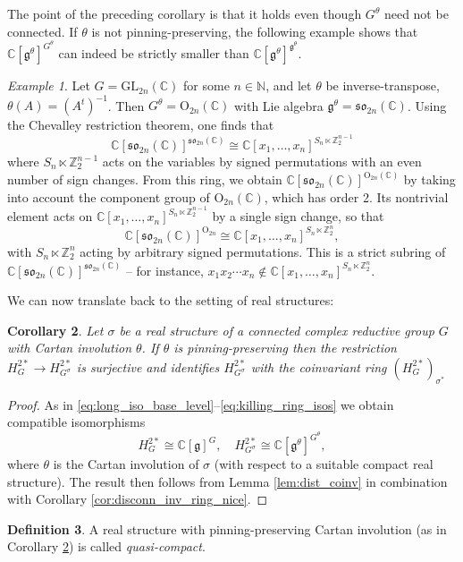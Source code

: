 \documentclass{amsart}
\newcommand{\C}{\mathbb{C}}
\newcommand{\g}{\mathfrak{g}}
\newcommand{\GL}{\mathrm{GL}}
\newcommand{\N}{\mathbb{N}}
\renewcommand{\O}{\mathrm{O}}
\newcommand{\so}{\mathfrak{so}}
\newcommand{\Z}{\mathbb{Z}}
\newcommand{\inv}{^{-1}}
\theoremstyle{definition}
\newtheorem{defn}{Definition}[section]
\theoremstyle{plain}
\newtheorem{cor}[defn]{Corollary}
\theoremstyle{remark}
\newtheorem{expl}[defn]{Example}
\begin{document}
The point of the preceding corollary is that it holds even though $G^\theta$ need not be connected. If $\theta$ is not pinning-preserving, the following example shows that $\C[\g^\theta]^{G^\theta}$ can indeed be strictly smaller than $\C[\g^\theta]^{\g^\theta}$.
\begin{expl}
\label{expl:typeAexpl}
    Let $G = \GL_{2n}(\C)$ for some $n\in \N$, and let $\theta$ be inverse-transpose, $\theta(A) = (A^t)\inv$. Then $G^\theta = \O_{2n}(\C)$ with Lie algebra $\g^\theta = \so_{2n}(\C)$. Using the Chevalley restriction theorem, one finds that
    $$
        \C[\so_{2n}(\C)]^{\so_{2n}(\C)}
        \cong
        \C[x_1,\ldots, x_n]^{S_n\ltimes \Z_2^{n-1}}
    $$
    where $S_n\ltimes \Z_2^{n-1}$ acts on the variables by signed permutations with an even number of sign changes. From this ring, we obtain $\C[\so_{2n}(\C)]^{\O_{2n}(\C)}$ by taking into account the component group of $\O_{2n}(\C)$, which has order 2. Its nontrivial element acts on $\C[x_1,\ldots, x_n]^{S_n\ltimes \Z_2^{n-1}}$ by a single sign change, so that
    $$
        \C[\so_{2n}(\C)]^{\O_{2n}}
        \cong 
        \C[x_1,\ldots, x_n]^{S_n\ltimes \Z_2^n},
    $$
    with $S_n\ltimes \Z_2^n$ acting by arbitrary signed permutations. This is a strict subring of $\C[\so_{2n}(\C)]^{\so_{2n}(\C)}$ -- for instance, $x_1x_2\cdots x_n\not \in \C[x_1,\ldots, x_n]^{S_n\ltimes \Z_2^n}$.
\end{expl}
We can now translate back to the setting of real structures:
\begin{cor}
\label{cor:qc_main}
    Let $\sigma$ be a real structure of a connected complex reductive group $G$ with Cartan involution $\theta$. If $\theta$ is pinning-preserving then the restriction
    $
        H^{2*}_G \to H^{2*}_{G^\sigma}
    $
    is surjective and identifies $H^{2*}_{G^\sigma}$ with the coinvariant ring $(H^{2*}_G)_{\sigma^*}$
\end{cor}
\begin{proof}
    As in \eqref{eq:long_iso_base_level}--\eqref{eq:killing_ring_isos} we obtain compatible isomorphisms
    $$
        H^{2*}_G \cong \C[\g]^G,
        \quad
        H^{2*}_{G^\sigma} \cong \C[\g^\theta]^{G^\theta},
    $$
    where $\theta$ is the Cartan involution of $\sigma$ (with respect to a suitable compact real structure). The result then follows from Lemma \ref{lem:dist_coinv} in combination with Corollary \ref{cor:disconn_inv_ring_nice}.
\end{proof}
\begin{defn}
\label{def:qcrs}
    A real structure with pinning-preserving Cartan involution (as in Corollary \ref{cor:qc_main}) is called \emph{quasi-compact}.
\end{defn}
\end{document}
